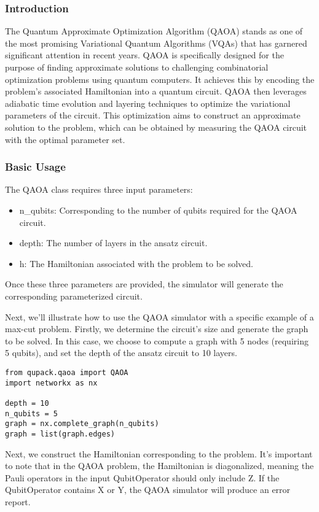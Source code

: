 
\subsubsection{Introduction}
The Quantum Approximate Optimization Algorithm (QAOA) stands as one of the most promising Variational Quantum Algorithms (VQAs) that has garnered significant attention in recent years. QAOA is specifically designed for the purpose of finding approximate solutions to challenging combinatorial optimization problems using quantum computers. It achieves this by encoding the problem's associated Hamiltonian into a quantum circuit. QAOA then leverages adiabatic time evolution and layering techniques to optimize the variational parameters of the circuit. This optimization aims to construct an approximate solution to the problem, which can be obtained by measuring the QAOA circuit with the optimal parameter set.

\subsubsection{Basic Usage}
The QAOA class requires three input parameters:
\begin{itemize}
    \item n\_qubits: Corresponding to the number of qubits required for the QAOA circuit.
    \item depth: The number of layers in the ansatz circuit.
    \item h: The Hamiltonian associated with the problem to be solved.
\end{itemize}

Once these three parameters are provided, the simulator will generate the corresponding parameterized circuit.

Next, we'll illustrate how to use the QAOA simulator with a specific example of a max-cut problem. Firstly, we determine the circuit's size and generate the graph to be solved. In this case, we choose to compute a graph with 5 nodes (requiring 5 qubits), and set the depth of the ansatz circuit to 10 layers.

\begin{lstlisting}
from qupack.qaoa import QAOA
import networkx as nx

depth = 10
n_qubits = 5
graph = nx.complete_graph(n_qubits)
graph = list(graph.edges)
\end{lstlisting}

Next, we construct the Hamiltonian corresponding to the problem. It's important to note that in the QAOA problem, the Hamiltonian is diagonalized, meaning the Pauli operators in the input QubitOperator should only include Z. If the QubitOperator contains X or Y, the QAOA simulator will produce an error report.

